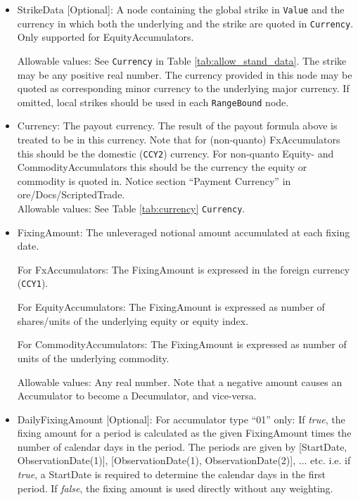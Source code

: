 \begin{itemize}

\item StrikeData [Optional]: A node containing the global strike in \lstinline!Value! and the currency in which both the underlying and the strike are quoted in \lstinline!Currency!. Only supported for EquityAccumulators. 

Allowable values: See \lstinline!Currency! in Table \ref{tab:allow_stand_data}. The strike may be any positive real number. The currency provided in this node may be quoted as corresponding minor currency to the underlying major currency. If omitted, local strikes should be used in each \lstinline!RangeBound! node.

\item Currency: The payout currency. The result of the payout formula above is treated to be in this currency. Note that for (non-quanto) FxAccumulators this should be the domestic (\lstinline!CCY2!) currency. For non-quanto Equity- and CommodityAccumulators this should be the currency the equity or commodity is quoted in. Notice section ``Payment Currency'' in ore/Docs/ScriptedTrade. \\

Allowable values: See Table \ref{tab:currency} \lstinline!Currency!.

\item FixingAmount: The unleveraged notional amount accumulated at each fixing date.

For FxAccumulators: The FixingAmount is expressed in the foreign currency (\lstinline!CCY1!). 

For EquityAccumulators: The FixingAmount is expressed as number of shares/units of the underlying equity or equity index.

For CommodityAccumulators: The FixingAmount is expressed as number of units of the underlying commodity.

    Allowable values: Any real number. Note that a negative amount causes an Accumulator to become a Decumulator, and vice-versa. 

\item DailyFixingAmount [Optional]: For accumulator type ``01'' only: If \emph{true}, the fixing amount for a period is calculated as the given FixingAmount times the number of calendar days in the period. The periods are given by [StartDate, ObservationDate(1)], [ObservationDate(1), ObservationDate(2)], ... etc. i.e. if \emph{true}, a StartDate is required to determine the calendar days in the first period. If \emph{false}, the fixing amount is used directly without any weighting.


\end{itemize}
